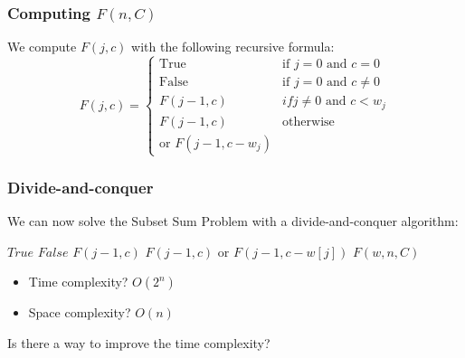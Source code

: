 \documentclass{beamer}
\begin{document}
\begin{frame}
  \frametitle{Computing $F(n, C)$}

  We compute $F(j, c)$ with the following recursive formula:
  \begin{displaymath}
    F(j, c) =
    \left\{
      \begin{array}{ll}
        \text{True} & \text{if $j = 0$ and $c = 0$} \\
        \text{False} & \text{if $j = 0$ and $c \neq 0$} \\
        F(j - 1, c) & if \text{$j \neq 0$ and $c < w_j$} \\
        F(j - 1, c) & \text{otherwise} \\
        \text{or } F(j - 1, c - w_j) &
      \end{array}
    \right.
  \end{displaymath}
\end{frame}

\begin{frame}
  \frametitle{Divide-and-conquer}

  \small
  We can now solve the Subset Sum Problem with a divide-and-conquer algorithm:

  \begin{minipage}[t]{0.68\linewidth}
    \begin{algorithmic}
      \State\Return$True$
      \Else{}
      \State\Return$False$
      \EndIf
      \State\Return$F(j - 1, c)$
      \Else{}
      \State\Return$F(j - 1, c) \text{ or } F(j - 1, c - w[j])$
      \EndIf
      \EndFunction{}
      \State\Return{} $F(w, n, C)$
      \EndFunction{}
    \end{algorithmic}
  \end{minipage}
  \hfill
  \begin{minipage}[t]{0.28\linewidth}
    \begin{itemize}
      \item \pause Time complexity? \pause $O(2^n)$
      \item \pause Space complexity? \pause $O(n)$
    \end{itemize}
  \end{minipage}

  \bigskip

  \pause Is there a way to improve the time complexity?
\end{frame}
\end{document}
